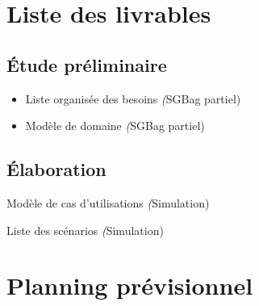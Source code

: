 \newcommand{\SGBag}{\emph (SGBag complet)}
\newcommand{\SGBagP}{\emph (SGBag partiel)}
\newcommand{\Simu}{\emph (Simulation)}
\newcommand{\Proto}{\emph (Prototype)}
\let\phase\subsection

\section{Liste des livrables}
\phase{Étude préliminaire}
\begin{itemize}
	\item Liste organisée des besoins \SGBagP
	\item Modèle de domaine \SGBagP
\end{itemize}

\phase{Élaboration}
	\item Modèle de cas d'utilisations \Simu
	\item Liste des scénarios \Simu
	\item 


\section{Planning prévisionnel}


